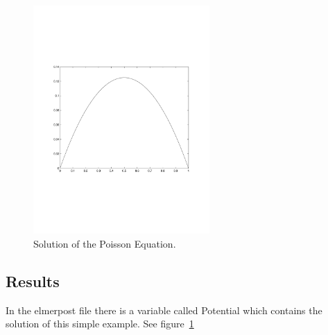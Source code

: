 \begin{figure}
\begin{center}
\includegraphics[width=0.6\textwidth]{1dheat}
\caption{Solution of the Poisson Equation.}\label{fg:pot}
\end{center}
\end{figure}
\subsection*{Results}

In the elmerpost file there is a variable called Potential which contains the
solution of this simple example. See figure~\ref{fg:pot}
